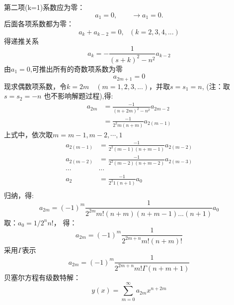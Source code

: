 	第二项(k=1)系数应为零：
	\begin{equation*}
		[(s+1) ^2 -n^2] a_1=0,\qquad \to a_1=0. 
	\end{equation*}	
	后面各项系数都为零：
	\begin{equation*}
		[(s+k) ^2 -n^2] a_k+ a_{k-2}=0, ~~~ (k=2,3,4,...)
	\end{equation*}	
	得递推关系
	\begin{equation*}
		a_k=-\frac{1}{(s+k) ^2 -n^2 } a_{k-2}
	\end{equation*}	
	由$a_1=0$,可推出所有的奇数项系数为零 \[a_{2m+1}=0\]
	现求偶数项系数，令$k=2m\quad (m=1,2,3,...)$，并取$s=s_1=n$, (注：取$s=s_2=-n$ 也不影响解题过程),得:
	\begin{equation*}
	\begin{aligned}
		a_{2m}&=\frac{-1}{(n+2m) ^2 -n^2 } a_{2m-2} \\
		&=\frac{-1}{2^2 m (n+m) } a_{2(m-1)}
	\end{aligned}
	\end{equation*}	
	上式中，依次取$m=m-1, m-2, \cdots, 1$
	\begin{equation*}
		\begin{aligned}
			a_{2(m-1)} &=\frac{-1}{2^2 (m-1) (n+m-1) } a_{2(m-2)} \\ 
			a_{2(m-2)} &=\frac{-1}{2^2 (m-2) (n+m-2) } a_{2(m-3)} \\ 
			\cdots &\cdots \\
			a_{2} &=\frac{-1}{2^2 1 (n+1) } a_{0} \\
		\end{aligned}
		\end{equation*}	
	归纳，得:
	\begin{equation*}
		a_{2m}=(-1)^m  \frac{1}{2^{2m} m! (n+m) (n+m-1)... (n+1) } a_0 
	\end{equation*}	
	取：$a_0=1/2^n n!$， 得：
	\begin{equation*}
		a_{2m}=(-1)^m  \frac{1}{2^{2m+n} m! (n+m) ! }
	\end{equation*}	
	采用$ \Gamma $表示
	\begin{equation*}
		a_{2m}=(-1)^m  \frac{1}{2^{2m+n} m! \Gamma(n+m+1) }
	\end{equation*}	
	贝塞尔方程有级数特解：
	\begin{equation*}
		y(x) = \sum\limits_{m=0}^{\infty} a_{2m} x^{n+2m} 
	\end{equation*}		
	


